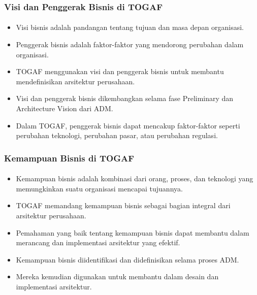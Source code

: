 \documentclass[aspectratio=169, table]{beamer}
\begin{document}
	\begin{frame}
		\frametitle{Visi dan Penggerak Bisnis di TOGAF}
		\framesubtitle{\hspace{1cm}}
		\begin{itemize}
			\item Visi bisnis adalah pandangan tentang tujuan dan masa depan organisasi.
			\item Penggerak bisnis adalah faktor-faktor yang mendorong perubahan dalam organisasi.
			\item TOGAF menggunakan visi dan penggerak bisnis untuk membantu mendefinisikan arsitektur perusahaan.
			\item Visi dan penggerak bisnis dikembangkan selama fase Preliminary dan Architecture Vision dari ADM.
			\item Dalam TOGAF, penggerak bisnis dapat mencakup faktor-faktor seperti perubahan teknologi, perubahan pasar, atau perubahan regulasi.
		\end{itemize}
	\end{frame}
	
	\begin{frame}
		\frametitle{Kemampuan Bisnis di TOGAF}
		\framesubtitle{\hspace{1cm}}
		\begin{itemize}
			\item Kemampuan bisnis adalah kombinasi dari orang, proses, dan teknologi yang memungkinkan suatu organisasi mencapai tujuannya.
			\item TOGAF memandang kemampuan bisnis sebagai bagian integral dari arsitektur perusahaan.
			\item Pemahaman yang baik tentang kemampuan bisnis dapat membantu dalam merancang dan implementasi arsitektur yang efektif.
			\item Kemampuan bisnis diidentifikasi dan didefinisikan selama proses ADM.
			\item Mereka kemudian digunakan untuk membantu dalam desain dan implementasi arsitektur.
		\end{itemize}
	\end{frame}
	
\end{document}
